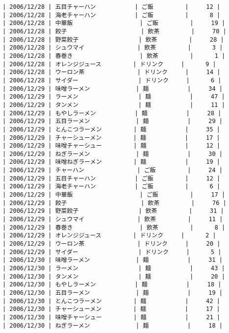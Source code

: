\documentclass{jlreq}
\begin{document}
\begin{enumerate}
\begin{lstlisting}
| 2006/12/28 | 五目チャーハン           | ご飯         |     12 |
| 2006/12/28 | 海老チャーハン           | ご飯         |      8 |
| 2006/12/28 | 中華飯                   | ご飯         |     19 |
| 2006/12/28 | 餃子                     | 飲茶         |     70 |
| 2006/12/28 | 野菜餃子                 | 飲茶         |     28 |
| 2006/12/28 | シュウマイ               | 飲茶         |      3 |
| 2006/12/28 | 春巻き                   | 飲茶         |      1 |
| 2006/12/28 | オレンジジュース         | ドリンク     |      9 |
| 2006/12/28 | ウーロン茶               | ドリンク     |     14 |
| 2006/12/28 | サイダー                 | ドリンク     |      6 |
| 2006/12/29 | 味噌ラーメン             | 麺           |     34 |
| 2006/12/29 | ラーメン                 | 麺           |     47 |
| 2006/12/29 | タンメン                 | 麺           |     11 |
| 2006/12/29 | もやしラーメン           | 麺           |     28 |
| 2006/12/29 | 五目ラーメン             | 麺           |     29 |
| 2006/12/29 | とんこつラーメン         | 麺           |     35 |
| 2006/12/29 | チャーシューメン         | 麺           |     17 |
| 2006/12/29 | 味噌チャーシュー         | 麺           |     12 |
| 2006/12/29 | ねぎラーメン             | 麺           |     30 |
| 2006/12/29 | 味噌ねぎラーメン         | 麺           |     19 |
| 2006/12/29 | チャーハン               | ご飯         |     24 |
| 2006/12/29 | 五目チャーハン           | ご飯         |     12 |
| 2006/12/29 | 海老チャーハン           | ご飯         |      6 |
| 2006/12/29 | 中華飯                   | ご飯         |     17 |
| 2006/12/29 | 餃子                     | 飲茶         |     76 |
| 2006/12/29 | 野菜餃子                 | 飲茶         |     31 |
| 2006/12/29 | シュウマイ               | 飲茶         |     11 |
| 2006/12/29 | 春巻き                   | 飲茶         |      8 |
| 2006/12/29 | オレンジジュース         | ドリンク     |      2 |
| 2006/12/29 | ウーロン茶               | ドリンク     |     20 |
| 2006/12/29 | サイダー                 | ドリンク     |      5 |
| 2006/12/30 | 味噌ラーメン             | 麺           |     31 |
| 2006/12/30 | ラーメン                 | 麺           |     43 |
| 2006/12/30 | タンメン                 | 麺           |     20 |
| 2006/12/30 | もやしラーメン           | 麺           |     18 |
| 2006/12/30 | 五目ラーメン             | 麺           |     19 |
| 2006/12/30 | とんこつラーメン         | 麺           |     42 |
| 2006/12/30 | チャーシューメン         | 麺           |     17 |
| 2006/12/30 | 味噌チャーシュー         | 麺           |     21 |
| 2006/12/30 | ねぎラーメン             | 麺           |     18 |

\end{lstlisting}
\end{enumerate}
\end{document}
